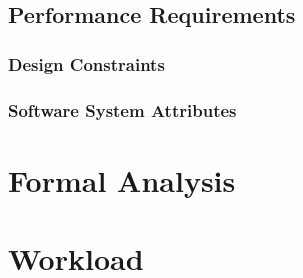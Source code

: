 \documentclass[a4paper, oneside]{book}
\begin{document}
\section{Performance Requirements}
\subsection{Design Constraints}
\subsection{Software System Attributes}

\chapter{Formal Analysis}

\chapter{Workload}

\end{document}
